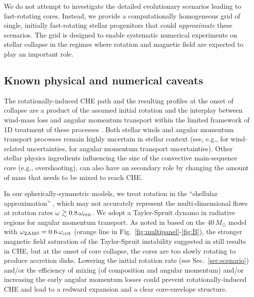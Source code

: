 \documentclass[%
trackchanges,twocolumn]{aastex701}
\DeclareRobustCommand{\Figref}[1]{Fig.~\ref{#1}}
\DeclareRobustCommand{\Secref}[1]{Sec.~\ref{#1}}
\begin{document}
We do not attempt to investigate the detailed evolutionary scenarios
leading to fast-rotating cores. Instead, we provide a computationally
homogeneous grid of single, initially fast-rotating stellar
progenitors that could \emph{approximate} these scenarios. The grid is designed to enable systematic numerical experiments on stellar collapse
in the regimes where rotation and magnetic field are expected to play an important role.


\subsection{Known physical and numerical caveats}
\label{sec:discussion_inputs}
The rotationally-induced CHE path \citep[e.g.,][]{maeder:00,
    yoon:06} and the resulting profiles at the onset of collapse are
a product of the assumed initial rotation and the interplay between
wind-mass loss and angular momentum transport within the
  limited framework of 1D treatment of these processes
  \cite[e.g.,][]{mombarg:24,rieutord:25}. Both stellar winds and
angular momentum transport processes remain highly uncertain in
stellar context (see, e.g., \citealt{puls:08, smith:14, vink:15,
  renzo:17, josiek:24, romagnolo:26} for wind-related uncertainties,
\citealt{spruit:99, cantiello:14, fuller:19, denhartogh:20,
  skoutnev:24, skoutnev:25} for angular momentum transport
uncertainties). Other stellar physics ingredients influencing
  the size of the convective main-sequence core (e.g., overshooting),
  can also have an secondary role by changing the amount of mass that
  needs to be mixed to reach CHE.

In our spherically-symmetric models, we treat rotation in
  the ``shellular approximation'' \citep[e.g.,][]{maeder:00}, which may
  not accurately represent the multi-dimensional flows at rotation
  rates $\omega\gtrsim0.8\,\omega_{\rm crit}$. We adopt a
Tayler-Spruit dynamo in radiative regions \citep{spruit:02} for
angular momentum transport. As noted in \cite{gottlieb:24} based on
the $40\,M_{\odot}$ model with
$\omega_{\rm ZAMS}=0.6\,\omega_{\rm crit}$ (orange line in
\Figref{fig:multipanel}-\ref{fig:B}), the stronger magnetic field
saturation of the Tayler-Spruit instability suggested in
\cite{fuller:19, fuller:22} still results in CHE, but at the onset of
core collapse, the cores are too slowly rotating to produce accretion
disks. Lowering the initial rotation rate (see
  \Secref{sec:scenario}) and/or the efficiency of mixing (of
  composition and angular momentum) and/or increasing the early
  angular momentum losses could prevent rotationally-induced CHE and
  lead to a redward expansion and a clear core-envelope
  structure.
\end{document}
